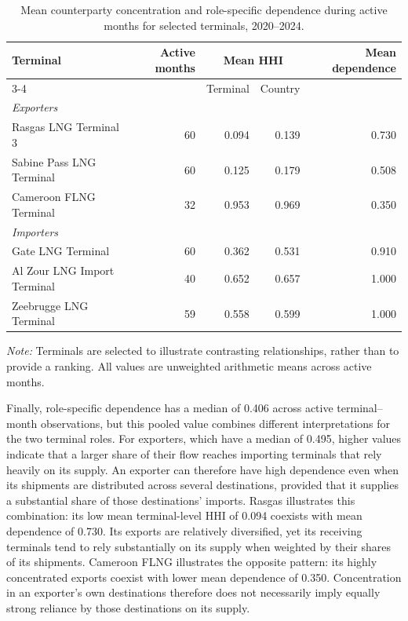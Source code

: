 \documentclass[pdftex,12pt,openright,a4paper,oneside]{book}
\begin{document}
\begin{table}[htbp]
\centering
\small
\setlength{\tabcolsep}{3pt}
\caption{Mean counterparty concentration and role-specific dependence during active months for selected terminals, 2020--2024.}
\label{tab:terminal_relationship_examples}
\begin{tabular}{lrrrr}
\toprule
Terminal & Active months & \multicolumn{2}{c}{Mean HHI} & Mean dependence \tabularnewline
\cmidrule(lr){3-4}
 & & Terminal & Country & \tabularnewline
\midrule
\multicolumn{5}{l}{\textit{Exporters}} \tabularnewline
Rasgas LNG Terminal 3 & 60 & 0.094 & 0.139 & 0.730 \tabularnewline
Sabine Pass LNG Terminal & 60 & 0.125 & 0.179 & 0.508 \tabularnewline
Cameroon FLNG Terminal & 32 & 0.953 & 0.969 & 0.350 \tabularnewline
\midrule
\multicolumn{5}{l}{\textit{Importers}} \tabularnewline
Gate LNG Terminal & 60 & 0.362 & 0.531 & 0.910 \tabularnewline
Al Zour LNG Import Terminal & 40 & 0.652 & 0.657 & 1.000 \tabularnewline
Zeebrugge LNG Terminal & 59 & 0.558 & 0.599 & 1.000 \tabularnewline
\bottomrule
\end{tabular}

\medskip
\begin{minipage}{0.95\textwidth}
\footnotesize
\textit{Note:} Terminals are selected to illustrate contrasting relationships, rather than to provide a ranking. All values are unweighted arithmetic means across active months.
\end{minipage}
\end{table}

Finally, role-specific dependence has a median of 0.406 across active terminal--month observations, but this pooled value combines different interpretations for the two terminal roles. 
For exporters, which have a median of 0.495, higher values indicate that a larger share of their flow reaches importing terminals that rely heavily on its supply.
An exporter can therefore have high dependence even when its shipments are distributed across several destinations, provided that it supplies a substantial share of those destinations' imports. 
Rasgas illustrates this combination: its low mean terminal-level HHI of 0.094 coexists with mean dependence of 0.730. Its exports are relatively diversified, yet its receiving terminals tend to rely substantially on its supply when weighted by their shares of its shipments. 
Cameroon FLNG illustrates the opposite pattern: its highly concentrated exports coexist with lower mean dependence of 0.350. Concentration in an exporter's own destinations therefore does not necessarily imply equally strong reliance by those destinations on its supply.
\end{document}
